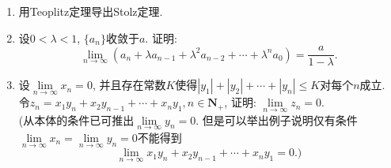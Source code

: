 \documentclass[a4paper,11pt,twoside]{ctexbook}
\begin{document}
\begin{enumerate}
	\item 用Teoplitz定理导出Stolz定理.

	\item 设$0<\lambda<1$, $\{a_n\}$收敛于$a$. 证明:
	      \[
		      \lim\limits_{n\to\infty} (a_n+\lambda a_{n-1}+\lambda^2 a_{n-2}+\cdots+\lambda^n a_0)=\dfrac{a}{1-\lambda}.
	      \]

	\item 设$\lim\limits_{n\to\infty} x_n=0$, 并且存在常数$K$使得$|y_1|+|y_2|+\cdots+|y_n|\leqslant K$对每个$n$成立. 令$z_n=x_1y_n+x_2y_{n-1}+\cdots+x_ny_1, n\in\mathbf{N}_{+}$, 证明: $\lim\limits_{n\to\infty} z_n=0$.\\
	      (从本体的条件已可推出$\lim\limits_{n\to\infty} y_n=0$. 但是可以举出例子说明仅有条件$\lim\limits_{n\to\infty} x_n=\lim\limits_{n\to\infty} y_n=0$不能得到
	      \[
		      \lim\limits_{n\to\infty} x_1y_n+x_2y_{n-1}+\cdots+x_ny_1=0.\text{)}
	      \]
\end{enumerate}

\ifx\all\undefined
\end{document}
